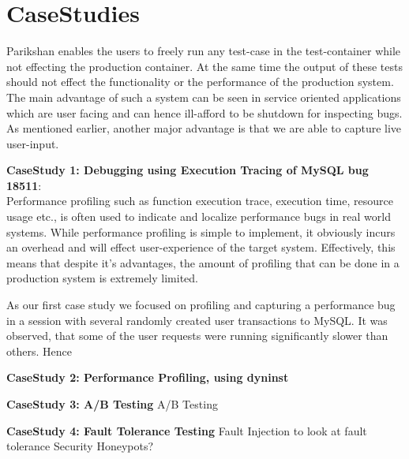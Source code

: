 \section{CaseStudies}
\label{sec:casestudy}

Parikshan enables the users to freely run any test-case in the test-container while not effecting the production container. 
At the same time the output of these tests should not effect the functionality or the performance of the production system.
The main advantage of such a system can be seen in service oriented applications which are user facing and can hence ill-afford to be shutdown for inspecting bugs.
As mentioned earlier, another major advantage is that we are able to capture live user-input. \\

\par \noindent \textbf{CaseStudy 1: Debugging using Execution Tracing of MySQL bug 18511}: \\ 
Performance profiling such as function execution trace, execution time, resource usage etc., is often used to indicate and localize performance bugs in real world systems. 
While performance profiling is simple to implement, it obviously incurs an overhead and will effect user-experience of the target system.
Effectively, this means that despite it's advantages, the amount of profiling that can be done in a production system is extremely limited. 

As our first case study we focused on profiling and capturing a performance bug in a session with several randomly created user transactions to MySQL. 
It was observed, that some of the user requests were running significantly slower than others. 
Hence 

\par \noindent \textbf{CaseStudy 2: Performance Profiling, using dyninst}

\par \noindent \textbf{CaseStudy 3: A/B Testing}
A/B Testing 

\par \noindent \textbf{CaseStudy 4: Fault Tolerance Testing}
Fault Injection to look at fault tolerance
Security Honeypots? 
